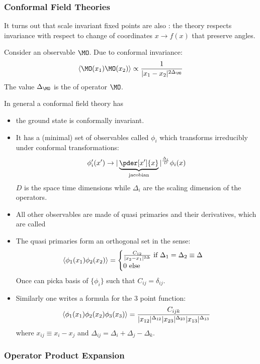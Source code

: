 \documentclass[11pt]{scrartcl}
\begin{document}
 \subsubsection{Conformal Field Theories}
 It turns out that scale invariant fixed points are also :  the theory respects invariance with respect to change of coordinates $x \rightarrow f(x)$ that preserve angles.  
 
 Consider an observable $\MO$. Due to conformal invariance:
 	\[\braket{\MO(x_1) \MO(x_2)} \propto {1 \over |x_1 - x_2|^{2 \Delta_\MO}} \]
 	The value $\Delta_\MO$ is the  of operator $\MO$.

In general a conformal field theory has
 \begin{itemize}
 	\item the ground state is conformally invariant.
 	\item It has a (minimal) set of observables called  $\phi_{i}$ which transforms irreducibly under conformal transformations:
 	\[\phi_i'(x') \rightarrow | \underbrace{\pder[x']{x}}_{\text{jacobian}}|^{\Delta_{i}\over D} \phi_i(x) \]
 	$D$ is the space time dimensions while $\Delta_i$ are the scaling dimension of the operators.
 	\item All other observables are made of quasi primaries and their derivatives, which are called 
 	\item The quasi primaries form an orthogonal set in the sense:
 	\begin{align*} 
 		\braket{\phi_1(x_1) \phi_2(x_2) }  =
 		\begin{cases} {C_{12} \over |x_2 - x_1|^{2 \Delta}} \text{ if } \Delta_1 = \Delta_2 \equiv \Delta \\
 	0  \text{ else}
 \end{cases} 
\end{align*}
Once can picka  basis of $\{ \phi_i \}$ such that $C_{ij} = \delta_{ij}$.
	\item Similarly one writes a formula for the 3 point function:
	\[ \braket{\phi_1(x_1) \phi_2(x_2) \phi_3(x_3)} = {C_{ijk} \over |x_{12}|^{\Delta_{12}} |x_{23}|^{\Delta_{23}} |x_{13}|^{\Delta_{13}}} \]
	where $x_{ij} \equiv x_i - x_j$ and $\Delta_{ij} = \Delta_{i} + \Delta_j - \Delta_{k}$.
 	\end{itemize}
 
 \subsubsection{Operator Product Expansion}
\end{document}
